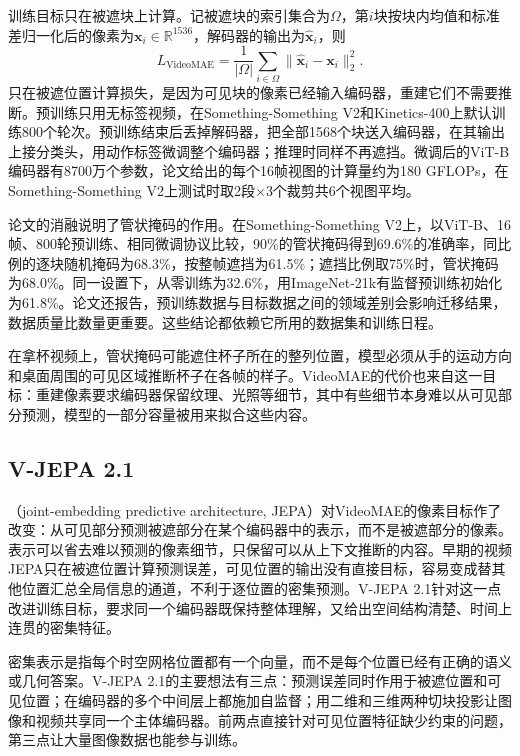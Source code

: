 训练目标只在被遮块上计算。记被遮块的索引集合为$\Omega$，第$i$块按块内均值和标准差归一化后的像素为$\bm x_i\in\mathbb R^{1536}$，解码器的输出为$\hat{\bm x}_i$，则
\begin{equation}
  L_{\mathrm{VideoMAE}}=\frac{1}{|\Omega|}\sum_{i\in\Omega}
  \lVert\hat{\bm x}_i-\bm x_i\rVert_2^2.
  \label{eq:vision-ivm-videomae}
\end{equation}
只在被遮位置计算损失，是因为可见块的像素已经输入编码器，重建它们不需要推断。预训练只用无标签视频，在Something-Something V2和Kinetics-400上默认训练800个轮次。预训练结束后丢掉解码器，把全部1568个块送入编码器，在其输出上接分类头，用动作标签微调整个编码器；推理时同样不再遮挡。微调后的ViT-B编码器有8700万个参数，论文给出的每个16帧视图的计算量约为180 GFLOPs，在Something-Something V2上测试时取2段$\times$3个裁剪共6个视图平均。

论文的消融说明了管状掩码的作用。在Something-Something V2上，以ViT-B、16帧、800轮预训练、相同微调协议比较，90\%的管状掩码得到69.6\%的准确率，同比例的逐块随机掩码为68.3\%，按整帧遮挡为61.5\%；遮挡比例取75\%时，管状掩码为68.0\%。同一设置下，从零训练为32.6\%，用ImageNet-21k有监督预训练初始化为61.8\%。论文还报告，预训练数据与目标数据之间的领域差别会影响迁移结果，数据质量比数量更重要。这些结论都依赖它所用的数据集和训练日程。

在拿杯视频上，管状掩码可能遮住杯子所在的整列位置，模型必须从手的运动方向和桌面周围的可见区域推断杯子在各帧的样子。VideoMAE的代价也来自这一目标：重建像素要求编码器保留纹理、光照等细节，其中有些细节本身难以从可见部分预测，模型的一部分容量被用来拟合这些内容。

\subsection{V-JEPA 2.1}
\label{sec:vision-ivm-vjepa}

（joint-embedding predictive architecture, JEPA）对VideoMAE的像素目标作了改变：从可见部分预测被遮部分在某个编码器中的表示，而不是被遮部分的像素。表示可以省去难以预测的像素细节，只保留可以从上下文推断的内容。早期的视频JEPA只在被遮位置计算预测误差，可见位置的输出没有直接目标，容易变成替其他位置汇总全局信息的通道，不利于逐位置的密集预测。V-JEPA 2.1针对这一点改进训练目标，要求同一个编码器既保持整体理解，又给出空间结构清楚、时间上连贯的密集特征。

密集表示是指每个时空网格位置都有一个向量，而不是每个位置已经有正确的语义或几何答案。V-JEPA 2.1的主要想法有三点：预测误差同时作用于被遮位置和可见位置；在编码器的多个中间层上都施加自监督；用二维和三维两种切块投影让图像和视频共享同一个主体编码器。前两点直接针对可见位置特征缺少约束的问题，第三点让大量图像数据也能参与训练。

